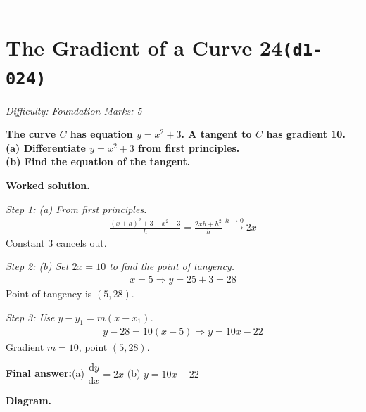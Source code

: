 \documentclass[11pt]{article}
\newcommand{\question}[1]{\par\medskip\noindent\textbf{#1}\par}
\begin{document}
\medskip\hrule

\section*{The Gradient of a Curve 24\quad\small\texttt{(d1-024)}}
\textit{Difficulty: Foundation \quad\textbar\quad Marks: 5}

\question{The curve \( C \) has equation \( y = x^2 + 3 \). A tangent to \( C \) has gradient 10.\\[3pt]  (a) Differentiate \( y = x^2 + 3 \) from first principles.\\[3pt]  (b) Find the equation of the tangent.}

\textbf{Worked solution.}

\textit{Step 1: (a) From first principles.}
\[\begin{gathered}
\frac{(x+h)^2 + 3 - x^2 - 3}{h} = \frac{2xh + h^2}{h} \xrightarrow{h\to0} 2x
\end{gathered}\]
Constant 3 cancels out.

\textit{Step 2: (b) Set \( 2x = 10 \) to find the point of tangency.}
\[\begin{gathered}
x = 5 \Rightarrow y = 25 + 3 = 28
\end{gathered}\]
Point of tangency is \( (5, 28) \).

\textit{Step 3: Use \( y - y_1 = m(x - x_1) \).}
\[\begin{gathered}
y - 28 = 10(x - 5) \Rightarrow y = 10x - 22
\end{gathered}\]
Gradient \( m = 10 \), point \( (5, 28) \).

\begin{answerbox}
\textbf{Final answer:}\quad (a) \(\displaystyle  \dfrac{\mathrm{d}y}{\mathrm{d}x} = 2x \) \quad  (b) \(\displaystyle  y = 10x - 22 \)
\end{answerbox}
\textbf{Diagram.}
\end{document}
